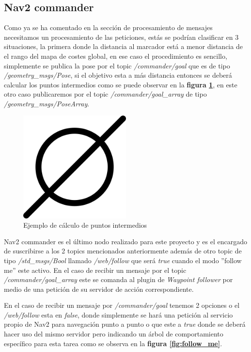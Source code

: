 \subsection{Nav2 commander}
Como ya se ha comentado en la sección de procesamiento de mensajes necesitamos un procesamiento de las peticiones, estás se podrían clasificar en 3 situaciones, la primera 
donde la distancia al marcador está a menor distancia de el rango del mapa de costes global, en ese caso el procedimiento es sencillo, simplemente se publica la pose por el topic 
\textit{/commander/goal} que es de tipo \textit{/geometry\_msgs/Pose}, si el objetivo esta a más distancia entonces se deberá calcular los puntos intermedios como se puede observar en la 
\textbf{figura \ref{fig:puntos_intermedios}}, en este otro caso publicaremos por el topic \textit{/commander/goal\_array} de tipo \textit{/geometry\_msgs/PoseArray}.


\begin{figure}[H]
    \centering
    \includegraphics[width=0.5\textwidth]{images/poner_foto.png}
    \caption{Ejemplo de cálculo de puntos intermedios}
    \label{fig:puntos_intermedios}
\end{figure}

Nav2 commander es el último nodo realizado para este proyecto y es el encargado de suscribirse a los 2 topics mencionados anteriormente 
además de otro topic de tipo \textit{/std\_msgs/Bool} llamado \textit{/web/follow} que será \textit{true} cuando el modo ''follow me'' este activo. En 
el caso de recibir un mensaje por el topic \textit{/commander/goal\_array} este se comanda al plugin de \textit{Waypoint follower} por medio de 
una petición de su servidor de acción correspondiente.

En el caso de recibir un mensaje por \textit{/commander/goal} tenemos 2 opciones o el \textit{/web/follow} esta en \textit{false}, donde simplemente 
se hará una petición al servicio propio de Nav2 para navegación punto a punto o que este a \textit{true} donde se deberá hacer uso del mismo servidor pero 
indicando un árbol de comportamiento específico para esta tarea como se observa en la \textbf{figura \ref{fig:follow_me}}.

